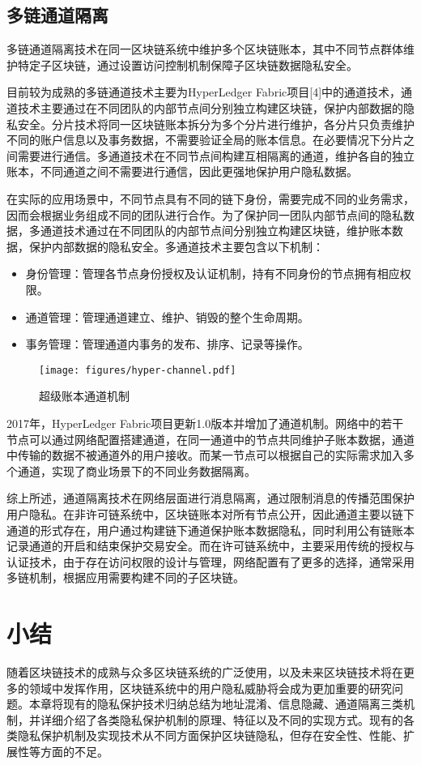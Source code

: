 \subsection{多链通道隔离}

多链通道隔离技术在同一区块链系统中维护多个区块链账本，其中不同节点群体维护特定子区块链，通过设置访问控制机制保障子区块链数据隐私安全。

目前较为成熟的多链通道技术主要为HyperLedger Fabric项目[4]中的通道技术，通道技术主要通过在不同团队的内部节点间分别独立构建区块链，保护内部数据的隐私安全。分片技术将同一区块链账本拆分为多个分片进行维护，各分片只负责维护不同的账户信息以及事务数据，不需要验证全局的账本信息。在必要情况下分片之间需要进行通信。多通道技术在不同节点间构建互相隔离的通道，维护各自的独立账本，不同通道之间不需要进行通信，因此更强地保护用户隐私数据。

在实际的应用场景中，不同节点具有不同的链下身份，需要完成不同的业务需求，因而会根据业务组成不同的团队进行合作。为了保护同一团队内部节点间的隐私数据，多通道技术通过在不同团队的内部节点间分别独立构建区块链，维护账本数据，保护内部数据的隐私安全。多通道技术主要包含以下机制：

\begin{itemize}
	\item 身份管理：管理各节点身份授权及认证机制，持有不同身份的节点拥有相应权限。
	\item 通道管理：管理通道建立、维护、销毁的整个生命周期。
	\item 事务管理：管理通道内事务的发布、排序、记录等操作。
\end{itemize}

\begin{figure}
\centering
\texttt{[image: figures/hyper-channel.pdf]}
\caption{超级账本通道机制}
\label{fig:hyper-channel}
\end{figure}

2017年，HyperLedger Fabric项目更新1.0版本并增加了通道机制。网络中的若干节点可以通过网络配置搭建通道，在同一通道中的节点共同维护子账本数据，通道中传输的数据不被通道外的用户接收。而某一节点可以根据自己的实际需求加入多个通道，实现了商业场景下的不同业务数据隔离。

综上所述，通道隔离技术在网络层面进行消息隔离，通过限制消息的传播范围保护用户隐私。在非许可链系统中，区块链账本对所有节点公开，因此通道主要以链下通道的形式存在，用户通过构建链下通道保护账本数据隐私，同时利用公有链账本记录通道的开启和结束保护交易安全。而在许可链系统中，主要采用传统的授权与认证技术，由于存在访问权限的设计与管理，网络配置有了更多的选择，通常采用多链机制，根据应用需要构建不同的子区块链。

\section{小结}

随着区块链技术的成熟与众多区块链系统的广泛使用，以及未来区块链技术将在更多的领域中发挥作用，区块链系统中的用户隐私威胁将会成为更加重要的研究问题。本章将现有的隐私保护技术归纳总结为地址混淆、信息隐藏、通道隔离三类机制，并详细介绍了各类隐私保护机制的原理、特征以及不同的实现方式。现有的各类隐私保护机制及实现技术从不同方面保护区块链隐私，但存在安全性、性能、扩展性等方面的不足。
